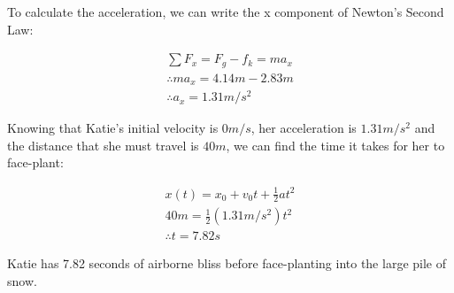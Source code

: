 \begin{problem}
To calculate the acceleration, we can write the x component of Newton's Second Law:

\begin{align*}
\sum F_x=F_g-f_k=ma_x
\\\therefore ma_x=4.14m-2.83m
\\\therefore a_x=1.31m/s^2
\end{align*}

Knowing that Katie's initial velocity is $0m/s$, her acceleration is $1.31m/s^2$ and the distance that she must travel is $40m$, we can find the time it takes for her to face-plant:

\begin{align*}
x(t)=x_0+v_0t+\frac{1}{2}at^{2}
\\40m=\frac{1}{2}(1.31m/s^{2})t^{2}
\\\therefore t=7.82s
\end{align*}


Katie has 7.82 seconds of airborne bliss before face-planting into the large pile of snow.\end{problem}